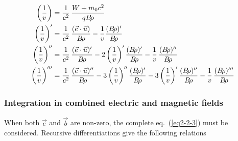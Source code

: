 \begin{equation}
	\begin{aligned}
		 \left(\dfrac{1}{ v}\right) 
		   & =   \dfrac{ 1 }{ c^2} \, 
		     \dfrac{W+m_0 c^2 }{ q\Br}\\
		 \left(\dfrac{1 }{ v}\right)^\prime 
		   & =  \dfrac{ 1 }{ c^2}\,
		     \dfrac{(\vec  e\cdot\vec  u) }{ \Br} 
		      - \dfrac{1 }{ v} \dfrac{(\Br )^\prime }{ \Br}\\
		 \left(\dfrac{1 }{ v}\right)^{\prime\prime}
		   & = 	\dfrac{ 1 }{ c^2} \,
		     \dfrac{(\vec  e\cdot\vec  u)^\prime }{ \Br}  
		     - 2\left(\dfrac{1}{v}\right)^\prime \dfrac{ (\Br )^\prime }{ \Br}  
		     - \dfrac{1 }{ v}\, \dfrac{(\Br)^{\prime\prime} }{ \Br}\\
		 \left(\dfrac{1 }{v}\right)^{\prime\prime\prime} 
		   & = \dfrac{ 1 }{c^2}\, \dfrac{(\vec  e\cdot\vec  u)^{\prime\prime} }{ \Br}  
		     -3\left(\dfrac{1 }{v}\right)^{\prime\prime}  \dfrac{(\Br )^\prime }{ \Br}  
		     -3\left(\dfrac{1 }{v}\right)^\prime \dfrac{(\Br )^{\prime\prime} }{ \Br}  
		     - \dfrac{1 }{ v}\, \dfrac{(\Br)^{\prime\prime\prime} }{ \Br}
	\end{aligned}
	\label{eq2-2-17}
\end{equation}



 \subsubsection{Integration in combined electric and magnetic fields} \label{sec2.2.3}%

 When both $ \vec  e $ and $ \vec  b $ are non-zero, the complete 
 eq.~(\ref{eq2-2-3}) must 
be considered. Recursive differentiations give the following relations 

